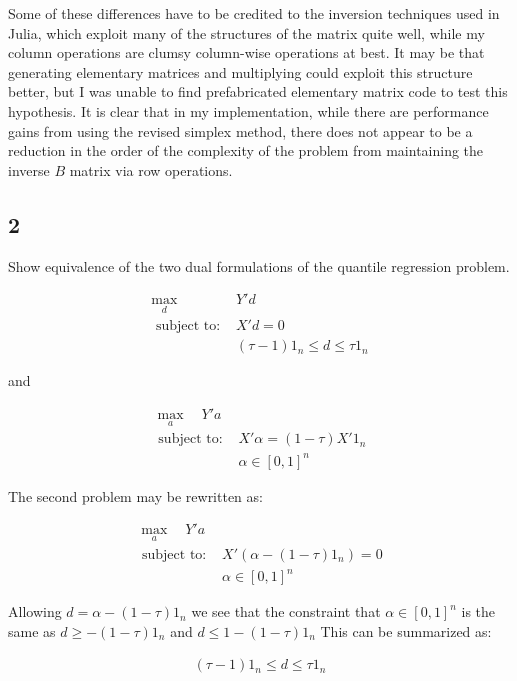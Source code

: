 \documentclass[12pt]{paper}
\begin{document}
Some of these differences have to be credited to the inversion
techniques used in Julia, which exploit many of the structures of the
matrix quite well, while my column operations are clumsy column-wise
operations at best. It may be that generating elementary matrices and
multiplying could exploit this structure better, but I was unable to
find prefabricated elementary matrix code to test this hypothesis. It
is clear that in my implementation, while there are performance gains
from using the revised simplex method, there does not appear to be a
reduction in the order of the complexity of the problem from
maintaining the inverse $B$ matrix via row operations. 



\subsection{2}



Show equivalence of the two dual formulations of the quantile
regression problem.

\begin{align*}
  \max_d \quad &Y'd\\
  \text{ subject  to: } & X'd = 0\\
  & (\tau-1)1_n \leq d \leq \tau 1_n
\end{align*}

and

\begin{align*}
  \max_a \quad Y'a\\
  \text{ subject to: } & X'\alpha = (1-\tau)X'1_n\\
  & \alpha \in [0,1]^n
\end{align*}

\vspace{.3in}

The second problem may be rewritten as:


\begin{align*}
  \max_a \quad Y'a\\
  \text{ subject to: } & X'(\alpha - (1-\tau)1_n) = 0\\
  & \alpha \in [0,1]^n
\end{align*}

Allowing $d = \alpha - (1-\tau)1_n$ we see that the constraint that $\alpha \in
[0,1]^n$ is the same as $d \geq -(1-\tau)1_n$ and $d \leq 1 - (1-\tau)1_n$ This
can be summarized as:

\begin{align*}
  (\tau-1)1_n \leq d \leq \tau 1_n
\end{align*}
\end{document}

